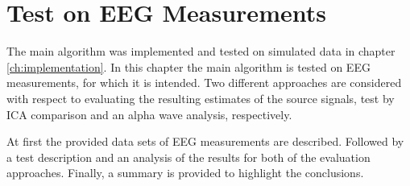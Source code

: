 \chapter{Test on EEG Measurements}\label{ch:eeg_test}
The main algorithm was implemented and tested on simulated data in chapter \ref{ch:implementation}. 
In this chapter the main algorithm is tested on EEG measurements, for which it is intended. 
Two different approaches are considered with respect to evaluating the resulting estimates of the source signals, test by ICA comparison and an alpha wave analysis, respectively.

At first the provided data sets of EEG measurements are described. 
Followed by a test description and an analysis of the results for both of the evaluation approaches. 
Finally, a summary is provided to highlight the conclusions.  

